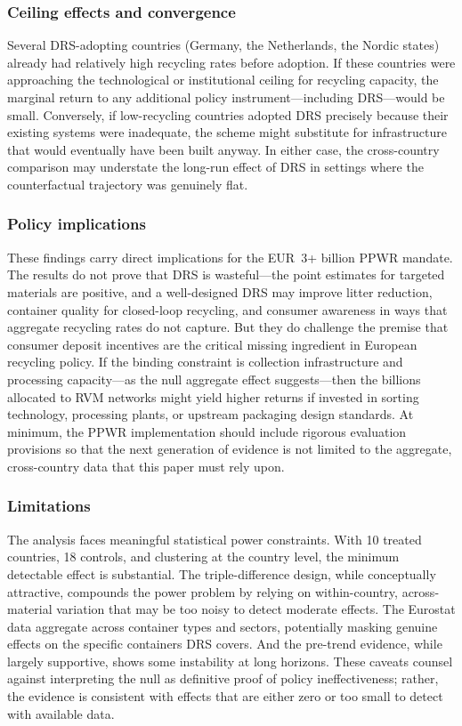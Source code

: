 \documentclass[12pt]{article}
\begin{document}
\subsubsection*{Ceiling effects and convergence} Several DRS-adopting countries (Germany, the Netherlands, the Nordic states) already had relatively high recycling rates before adoption. If these countries were approaching the technological or institutional ceiling for recycling capacity, the marginal return to any additional policy instrument---including DRS---would be small. Conversely, if low-recycling countries adopted DRS precisely because their existing systems were inadequate, the scheme might substitute for infrastructure that would eventually have been built anyway. In either case, the cross-country comparison may understate the long-run effect of DRS in settings where the counterfactual trajectory was genuinely flat.

\subsubsection*{Policy implications} These findings carry direct implications for the EUR~3+ billion PPWR mandate. The results do not prove that DRS is wasteful---the point estimates for targeted materials are positive, and a well-designed DRS may improve litter reduction, container quality for closed-loop recycling, and consumer awareness in ways that aggregate recycling rates do not capture. But they do challenge the premise that consumer deposit incentives are the critical missing ingredient in European recycling policy. If the binding constraint is collection infrastructure and processing capacity---as the null aggregate effect suggests---then the billions allocated to RVM networks might yield higher returns if invested in sorting technology, processing plants, or upstream packaging design standards. At minimum, the PPWR implementation should include rigorous evaluation provisions so that the next generation of evidence is not limited to the aggregate, cross-country data that this paper must rely upon.

\subsubsection*{Limitations} The analysis faces meaningful statistical power constraints. With 10 treated countries, 18 controls, and clustering at the country level, the minimum detectable effect is substantial. The triple-difference design, while conceptually attractive, compounds the power problem by relying on within-country, across-material variation that may be too noisy to detect moderate effects. The Eurostat data aggregate across container types and sectors, potentially masking genuine effects on the specific containers DRS covers. And the pre-trend evidence, while largely supportive, shows some instability at long horizons. These caveats counsel against interpreting the null as definitive proof of policy ineffectiveness; rather, the evidence is consistent with effects that are either zero or too small to detect with available data.
\end{document}
